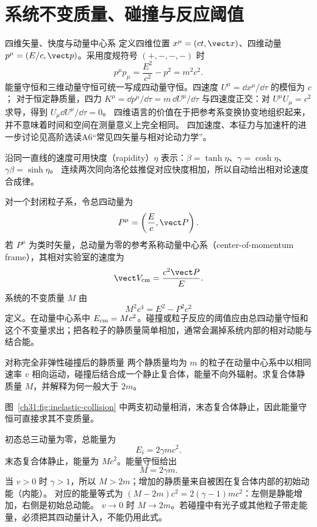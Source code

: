 \section{系统不变质量、碰撞与反应阈值}
\begin{starread}{四维矢量、快度与动量中心系}
定义四维位置 $x^\mu=(ct,\vect x)$、四维动量 $p^\mu=(E/c,\vect p)$。采用度规符号
$(+,-,-,-)$ 时
\[
 p^\mu p_\mu=\frac{E^2}{c^2}-p^2=m^2c^2.
\]
能量守恒和三维动量守恒可统一写成四动量守恒。四速度 $U^\mu=\dd x^\mu/\dd\tau$ 的模恒为 $c$；
对于恒定静质量，四力 $K^\mu=\dd p^\mu/\dd\tau=m\,\dd U^\mu/\dd\tau$ 与四速度正交：对 $U^\mu U_\mu=c^2$ 求导，得到 $U_\mu\dd U^\mu/\dd\tau=0$。
四维语言的价值在于把参考系变换协变地组织起来，并不意味着时间和空间在测量意义上完全相同。
四加速度、本征力与加速杆的进一步讨论见高阶选读A6“常见四矢量与相对论动力学”。

沿同一直线的速度可用快度（rapidity）$\eta$ 表示：$\beta=\tanh\eta$、$\gamma=\cosh\eta$、$\gamma\beta=\sinh\eta$。
连续两次同向洛伦兹推促对应快度相加，所以自动给出相对论速度合成律。

对一个封闭粒子系，令总四动量为
\[
 P^\mu=\left(\frac{E}{c},\vect P\right).
\]
若 $P^\mu$ 为类时矢量，总动量为零的参考系称动量中心系（center-of-momentum frame），其相对实验室的速度为
\[
 \vect V_{\rm cm}=\frac{c^2\vect P}{E}.
\]
系统的不变质量 $M$ 由
\[
 M^2c^4=E^2-P^2c^2
\]
定义。在动量中心系中 $E_{\rm cm}=Mc^2$。碰撞或粒子反应的阈值应由总四动量守恒和这个不变量求出；把各粒子的静质量简单相加，通常会漏掉系统内部的相对动能与结合能。



\end{starread}
\begin{origexamplebox}{对称完全非弹性碰撞后的静质量}
两个静质量均为 $m$ 的粒子在动量中心系中以相同速率 $v$ 相向运动，碰撞后结合成一个静止复合体，能量不向外辐射。求复合体静质量 $M$，并解释为何一般大于 $2m$。
\begin{center}

\label{ch31:fig:collision-question}
\end{center}
\end{origexamplebox}
\begin{xesolution}
\begin{center}

\label{ch31:fig:inelastic-collision}
\end{center}
图~\ref{ch31:fig:inelastic-collision} 中两支初动量相消，末态复合体静止，因此能量守恒可直接求其不变质量。


初态总三动量为零，总能量为
\[
 E_i=2\gamma mc^2.
\]
末态复合体静止，能量为 $Mc^2$。能量守恒给出
\[
 \boxed{M=2\gamma m}.
\]
当 $v>0$ 时 $\gamma>1$，所以 $M>2m$；增加的静质量来自被困在复合体内部的初始动能（内能）。
对应的能量等式为 $(M-2m)c^2=2(\gamma-1)mc^2$：左侧是静能增加，右侧是初始总动能。
$v\to0$ 时 $M\to2m$。若碰撞中有光子或其他粒子带走能量，必须把其四动量计入，不能仍用此式。
\end{xesolution}





